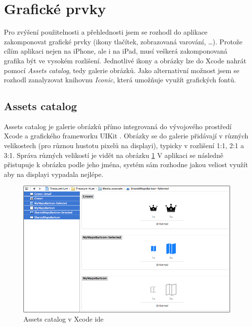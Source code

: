 \section{Grafické prvky}\label{analyza-graficke-prvky}

Pro zvýšení použitelnosti a přehlednosti jsem se rozhodl do aplikace zakomponovat grafické prvky (ikony tlačítek, zobrazovaná varování, \ldots).
Protože cílím aplikaci nejen na iPhone, ale i na iPad, musí veškerá zakomponovaná grafika být ve vysokém rozlišení.
Jednotlivé ikony a obrázky lze do Xcode nahrát pomocí \textit{Assets catalog}, tedy galerie obrázků.
Jako alternativní možnost jsem se rozhodl zanalyzovat knihovnu \textit{Iconic}, která umožňuje využít grafických fontů.

\subsection{Assets catalog}

Assets catalog je galerie obrázků přímo integrovaná do vývojového prostředí Xcode a grafického frameworku UIKit \cite{apple-xcode-assets-catalog}.
Obrázky se do galerie přidávají v různých velikostech (pro různou hustotu pixelů na displayi), typicky v rozlišení 1:1, 2:1 a 3:1.
Správa různých velikostí je vidět na obrázku \ref{fig:xcode-assets-catalog}
V aplikaci se následně přistupuje k obrázku podle jeho jména, systém sám rozhodne jakou veliost využít aby na displayi vypadala nejlépe.

\begin{figure}\centering
	\includegraphics[width=\textwidth]{assets/analysis-graphics-assets-catalog.png}
	\caption{Assets catalog v Xcode \acrshort{ide} \cite{rw-update-app-for-ios7}}\label{fig:xcode-assets-catalog}
\end{figure}

